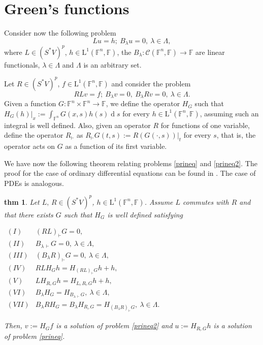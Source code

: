 \documentclass[a4paper,12pt,onecolumn]{article}
\theoremstyle{ptheorem}
\newtheorem{thm}{thm}[section]
\theoremstyle{hdef}
\theoremstyle{premark}
\numberwithin{equation}{section}
\numberwithin{figure}{section}
\DeclareMathOperator{\dif}{d}
\newcommand{\cC}{{\mathcal C}}
\newcommand{\bF}{{\mathbb F}}
\renewcommand{\l}{\lambda}
\newcommand{\<}{\langle}
\renewcommand{\>}{\rangle}
\renewcommand{\<}{\left<}
\renewcommand{\>}{\right>}
\renewcommand{\(}{\left(}
\renewcommand{\)}{\right)}
\newcommand{\Lsp}[1]{\operatorname{L^{#1}}}
\begin{document}
\section{Green's functions}
Consider now the following problem
\begin{equation}\label{prineq}
Lu=h;\  B_\l u=0,\ \l\in\Lambda,
\end{equation}
where $L\in(S^*V)^p$, $h\in \Lsp{1}(\bF^n,\bF)$, the $B_\l:\cC(\bF^n,\bF)\to\bF$ are linear functionals, $\l\in\Lambda$ and $\Lambda$ is an arbitrary set.

Let $R\in(S^*V)^p$, $f\in \Lsp{1}(\bF^n,\bF)$ and consider the problem
\begin{equation}\label{prineq2}
RLv=f;\  B_\l v=0,\  B_\l Rv=0,\ \l\in\Lambda.
\end{equation}
Given a function $G:\bF^n\times\bF^n\to\bF$, we define the operator $H_G$ such that $H_G(h)|_x:=\int_{\bF^n} G(x,s)h(s)\dif s$ for every $h\in\Lsp{1}(\bF^n,\bF)$, assuming such an integral is well defined. Also, given an operator $R$ for functions of one variable, define the operator $R_\vdash$ as $R_\vdash G(t,s):=R(G(\cdot,s))|_{t}$ for every $s$, that is, the operator acts on $G$ as a function of its first variable. \par
We have now the following theorem relating problems \eqref{prineq} and \eqref{prineq2}. The proof for the case of ordinary differential equations can be found in \cite{CTMal}. The case of PDEs is analogous.
\begin{thm}\label{theoremmostgen}
	Let $L,\,R\in(S^*V)^p$, $h\in\Lsp{1}(\bF^n,\bF)$. Assume $L$ commutes with $R$ and that there exists $G$ such that $H_G$ is well defined satisfying\par
	$\begin{array}{rl}
	(I) & (RL)_\vdash G=0,\\
	(II) & B_{\l\,\vdash} G=0,\ \l\in\Lambda,\\
	(III) & ( B_\l R)_\vdash G=0,\ \l\in\Lambda,\\
	(IV) & RLH_Gh=H_{(RL)_\vdash G}h+h,\\
	(V) & LH_{R_\vdash G}h=H_{L_\vdash R_\vdash G}h+h,\\
	(VI) &  B_\l H_G= H_{B_{\l\,\vdash} G},\ \l\in\Lambda,\\
	(VII) &  B_\l RH_G= B_\l H_{R_\vdash G}=H_{( B_\l R)_\vdash G},\ \l\in\Lambda.
	\end{array}$\par
	Then, $v:=H_Gf$ is a solution of problem \eqref{prineq2} and $u:=H_{R_\vdash G}h$ is a solution of problem \eqref{prineq}.
\end{thm}
\end{document}
